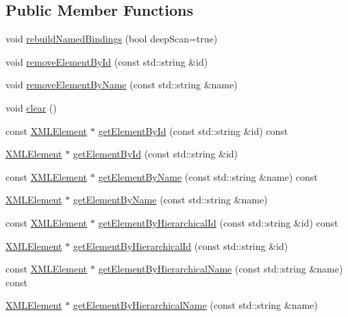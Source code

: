 \subsection*{Public Member Functions}
\begin{DoxyCompactItemize}
\item 
void \hyperlink{classXMLDOM_1_1XMLDocument_a739000da7ba734adbe7114db1120891b}{rebuild\+Named\+Bindings} (bool deep\+Scan=true)
\item 
void \hyperlink{classXMLDOM_1_1XMLDocument_abe501e7b169b45f1f26418c145d4365e}{remove\+Element\+By\+Id} (const std\+::string \&id)
\item 
void \hyperlink{classXMLDOM_1_1XMLDocument_afc5d54ab623bafee4c186c9c87f6c485}{remove\+Element\+By\+Name} (const std\+::string \&name)
\item 
void \hyperlink{classXMLDOM_1_1XMLDocument_a3101fae4eab3b7f414f462073a62a059}{clear} ()
\item 
const \hyperlink{classXMLDOM_1_1XMLElement}{X\+M\+L\+Element} $\ast$ \hyperlink{classXMLDOM_1_1XMLDocument_addc86fdde683287b6ebc83f7f014f54d}{get\+Element\+By\+Id} (const std\+::string \&id) const 
\item 
\hyperlink{classXMLDOM_1_1XMLElement}{X\+M\+L\+Element} $\ast$ \hyperlink{classXMLDOM_1_1XMLDocument_a2886be75a319474d1c62e8954256671b}{get\+Element\+By\+Id} (const std\+::string \&id)
\item 
const \hyperlink{classXMLDOM_1_1XMLElement}{X\+M\+L\+Element} $\ast$ \hyperlink{classXMLDOM_1_1XMLDocument_a91c952fd0a92403c98f91d7dd1634e09}{get\+Element\+By\+Name} (const std\+::string \&name) const 
\item 
\hyperlink{classXMLDOM_1_1XMLElement}{X\+M\+L\+Element} $\ast$ \hyperlink{classXMLDOM_1_1XMLDocument_a919b2e677929fe5fa80498ba4223e030}{get\+Element\+By\+Name} (const std\+::string \&name)
\item 
const \hyperlink{classXMLDOM_1_1XMLElement}{X\+M\+L\+Element} $\ast$ \hyperlink{classXMLDOM_1_1XMLDocument_ab3233ab561fa80459491578764e70cf7}{get\+Element\+By\+Hierarchical\+Id} (const std\+::string \&id) const 
\item 
\hyperlink{classXMLDOM_1_1XMLElement}{X\+M\+L\+Element} $\ast$ \hyperlink{classXMLDOM_1_1XMLDocument_aee0d066fec37c7e3b81e8c17f809224f}{get\+Element\+By\+Hierarchical\+Id} (const std\+::string \&id)
\item 
const \hyperlink{classXMLDOM_1_1XMLElement}{X\+M\+L\+Element} $\ast$ \hyperlink{classXMLDOM_1_1XMLDocument_af37e0315519eeeb0e2ad53fefd15cd49}{get\+Element\+By\+Hierarchical\+Name} (const std\+::string \&name) const 
\item 
\hyperlink{classXMLDOM_1_1XMLElement}{X\+M\+L\+Element} $\ast$ \hyperlink{classXMLDOM_1_1XMLDocument_aaf4d4dcd6d75595107bdacb394e83240}{get\+Element\+By\+Hierarchical\+Name} (const std\+::string \&name)
\end{DoxyCompactItemize}
